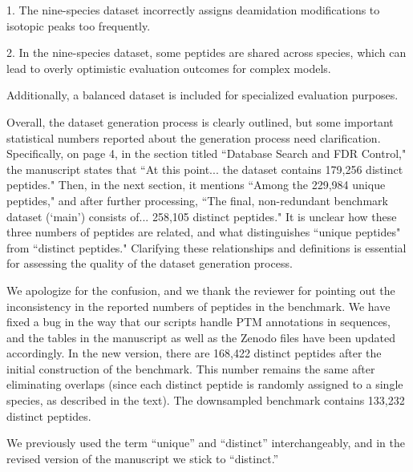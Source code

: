 \documentclass{article}
\newcommand{\response}[1]{\vspace*{1ex} \color{blue} \noindent #1 \color{black}
	\vspace*{2ex}}
\begin{document}
1. The nine-species dataset incorrectly assigns deamidation modifications to isotopic peaks too frequently.

2. In the nine-species dataset, some peptides are shared across species, which can lead to overly optimistic evaluation outcomes for complex models.

Additionally, a balanced dataset is included for specialized evaluation purposes.

Overall, the dataset generation process is clearly outlined, but some important statistical numbers reported about the generation process need clarification. Specifically, on page 4, in the section titled ``Database Search and FDR Control," the manuscript states that ``At this point... the dataset contains 179,256 distinct peptides." Then, in the next section, it mentions ``Among the 229,984 unique peptides," and after further processing, ``The final, non-redundant benchmark dataset (`main') consists of... 258,105 distinct peptides." It is unclear how these three numbers of peptides are related, and what distinguishes ``unique peptides" from ``distinct peptides." Clarifying these relationships and definitions is essential for assessing the quality of the dataset generation process.

\response{We apologize for the confusion, and we thank the reviewer for pointing out the inconsistency in the reported numbers of peptides in the benchmark.
  We have fixed a bug in the way that our scripts handle PTM annotations in sequences, and the tables in the manuscript as well as the Zenodo files have been updated accordingly.
  In the new version, there are 168,422 distinct peptides after the initial construction of the benchmark.
  This number remains the same after eliminating overlaps (since each distinct peptide is randomly assigned to a single species, as described in the text).
  The downsampled benchmark contains 133,232 distinct peptides.

  We previously used the term ``unique'' and ``distinct'' interchangeably, and in the revised version of the manuscript we stick to ``distinct.''
}



\end{document}
